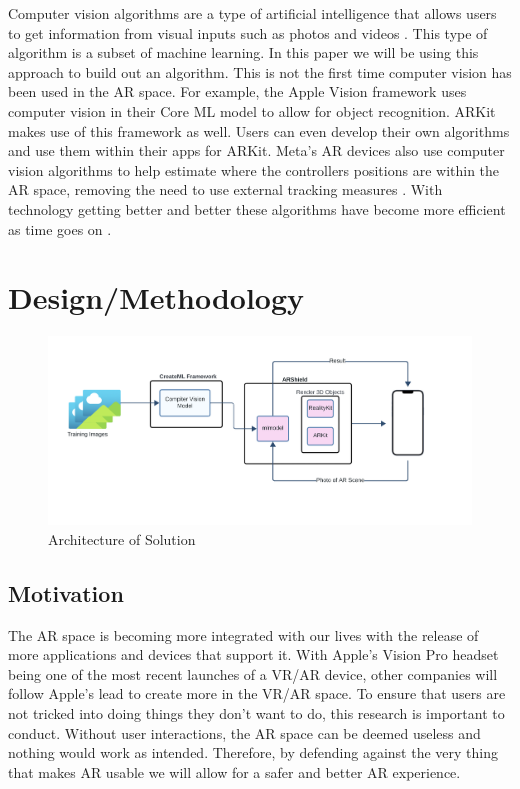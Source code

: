 \documentclass[conference]{IEEEtran}
\begin{document}
Computer vision algorithms are a type of artificial intelligence that allows users to get information from visual inputs such as photos and videos \cite{noauthor_what_nodate}. This type of algorithm is a subset of machine learning. In this paper we will be using this approach to build out an algorithm. This is not the first time computer vision has been used in the AR space. For example, the Apple Vision framework uses computer vision in their Core ML model to allow for object recognition. ARKit makes use of this framework as well. Users can even develop their own algorithms and use them within their apps for ARKit. Meta's AR devices also use computer vision algorithms to help estimate where the controllers positions are within the AR space, removing the need to use external tracking measures \cite{noauthor_how_nodate}. With technology getting better and better these algorithms have become more efficient as time goes on \cite{noauthor_how_nodate}.

\section{Design/Methodology}

\begin{figure}[!t]
  \centering
  \includegraphics[width=\textwidth]{fig2.png}
  \caption{Architecture of Solution}
  \label{fig:example}
\end{figure}

\subsection{Motivation}

The AR space is becoming more integrated with our lives with the release of more applications and devices that support it. With Apple's Vision Pro headset being one of the most recent launches of a VR/AR device, other companies will follow Apple's lead to create more in the VR/AR space. To ensure that users are not tricked into doing things they don't want to do, this research is important to conduct. Without user interactions, the AR space can be deemed useless and nothing would work as intended. Therefore, by defending against the very thing that makes AR usable we will allow for a safer and better AR experience. 
\end{document}

